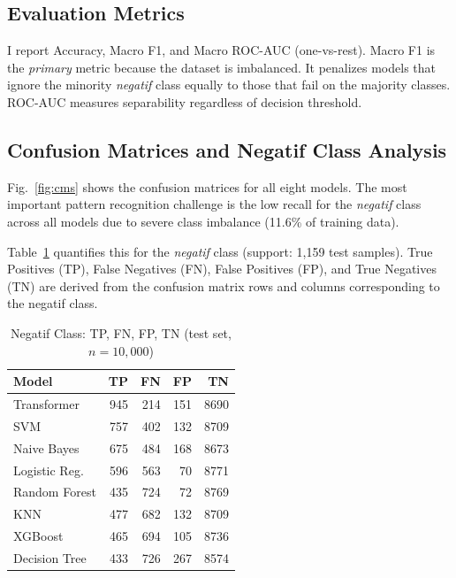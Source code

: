 \documentclass[conference]{IEEEtran}
\begin{document}
\subsection{Evaluation Metrics}

I report Accuracy, Macro F1, and Macro ROC-AUC (one-vs-rest). Macro F1 is the
\textit{primary} metric because the dataset is imbalanced. It penalizes models that
ignore the minority \textit{negatif} class equally to those that fail on the majority
classes. ROC-AUC measures separability regardless of decision threshold.

\subsection{Confusion Matrices and Negatif Class Analysis}

Fig.~\ref{fig:cms} shows the confusion matrices for all eight models. The most important
pattern recognition challenge is the low recall for the \textit{negatif} class across
all models due to severe class imbalance (11.6\% of training data).

Table~\ref{tab:negatif_tp} quantifies this for the \textit{negatif} class
(support: 1,159 test samples). True Positives (TP), False Negatives (FN), False Positives
(FP), and True Negatives (TN) are derived from the confusion matrix rows and columns
corresponding to the negatif class.

\begin{table}[htbp]
	\caption{Negatif Class: TP, FN, FP, TN (test set, $n=10{,}000$)}
	\label{tab:negatif_tp}
	\begin{center}
		\footnotesize
		\renewcommand{\arraystretch}{1.2}
		\setlength{\tabcolsep}{5pt}
		\begin{tabular}{lrrrr}
			\toprule
			\rowcolor{headerblue}
			\color{white}\textbf{Model} & \color{white}\textbf{TP} & \color{white}\textbf{FN} & \color{white}\textbf{FP} & \color{white}\textbf{TN} \\
			\midrule
			Transformer      & 945 & 214 & 151 & 8690 \\
			SVM              & 757 & 402 & 132 & 8709 \\
			Naive Bayes      & 675 & 484 & 168 & 8673 \\
			Logistic Reg.    & 596 & 563 &  70 & 8771 \\
			Random Forest    & 435 & 724 &  72 & 8769 \\
			KNN              & 477 & 682 & 132 & 8709 \\
			XGBoost          & 465 & 694 & 105 & 8736 \\
			Decision Tree    & 433 & 726 & 267 & 8574 \\
			\bottomrule
		\end{tabular}
	\end{center}
\end{table}
\end{document}
